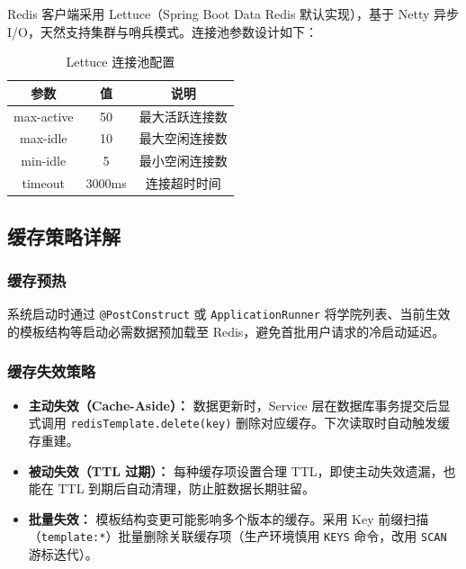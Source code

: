 \documentclass{../../softeng}
\begin{document}
Redis 客户端采用 Lettuce（Spring Boot Data Redis 默认实现），基于 Netty 异步 I/O，天然支持集群与哨兵模式。连接池参数设计如下：

\begin{table}[htbp]
\centering
\caption{Lettuce 连接池配置}
\label{tab:lettuce-config}
\begin{tabular}{|c|c|c|}
\hline
\textbf{参数} & \textbf{值} & \textbf{说明} \\
\hline
max-active & 50 & 最大活跃连接数 \\
\hline
max-idle & 10 & 最大空闲连接数 \\
\hline
min-idle & 5 & 最小空闲连接数 \\
\hline
timeout & 3000ms & 连接超时时间 \\
\hline
\end{tabular}
\end{table}

\subsection{缓存策略详解}

\subsubsection{缓存预热}

系统启动时通过 \texttt{@PostConstruct} 或 \texttt{ApplicationRunner} 将学院列表、当前生效的模板结构等启动必需数据预加载至 Redis，避免首批用户请求的冷启动延迟。

\subsubsection{缓存失效策略}

\begin{itemize}
    \item \textbf{主动失效（Cache-Aside）：} 数据更新时，Service 层在数据库事务提交后显式调用 \texttt{redisTemplate.delete(key)} 删除对应缓存。下次读取时自动触发缓存重建。
    \item \textbf{被动失效（TTL 过期）：} 每种缓存项设置合理 TTL，即使主动失效遗漏，也能在 TTL 到期后自动清理，防止脏数据长期驻留。
    \item \textbf{批量失效：} 模板结构变更可能影响多个版本的缓存。采用 Key 前缀扫描（\texttt{template:*}）批量删除关联缓存项（生产环境慎用 \texttt{KEYS} 命令，改用 \texttt{SCAN} 游标迭代）。
\end{itemize}
\end{document}
